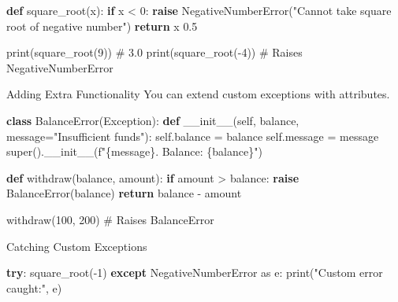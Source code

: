 \documentclass[
  letterpaper,
  DIV=11,
  numbers=noendperiod]{scrreprt}
\newenvironment{Shaded}{\begin{snugshade}}{\end{snugshade}}
\newcommand{\BuiltInTok}[1]{\textcolor[rgb]{0.00,0.23,0.31}{#1}}
\newcommand{\CommentTok}[1]{\textcolor[rgb]{0.37,0.37,0.37}{#1}}
\newcommand{\ControlFlowTok}[1]{\textcolor[rgb]{0.00,0.23,0.31}{\textbf{#1}}}
\newcommand{\DecValTok}[1]{\textcolor[rgb]{0.68,0.00,0.00}{#1}}
\newcommand{\FloatTok}[1]{\textcolor[rgb]{0.68,0.00,0.00}{#1}}
\newcommand{\FunctionTok}[1]{\textcolor[rgb]{0.28,0.35,0.67}{#1}}
\newcommand{\ImportTok}[1]{\textcolor[rgb]{0.00,0.46,0.62}{#1}}
\newcommand{\KeywordTok}[1]{\textcolor[rgb]{0.00,0.23,0.31}{\textbf{#1}}}
\newcommand{\NormalTok}[1]{\textcolor[rgb]{0.00,0.23,0.31}{#1}}
\newcommand{\OperatorTok}[1]{\textcolor[rgb]{0.37,0.37,0.37}{#1}}
\newcommand{\PreprocessorTok}[1]{\textcolor[rgb]{0.68,0.00,0.00}{#1}}
\newcommand{\SpecialCharTok}[1]{\textcolor[rgb]{0.37,0.37,0.37}{#1}}
\newcommand{\SpecialStringTok}[1]{\textcolor[rgb]{0.13,0.47,0.30}{#1}}
\newcommand{\StringTok}[1]{\textcolor[rgb]{0.13,0.47,0.30}{#1}}
\newcommand{\VariableTok}[1]{\textcolor[rgb]{0.07,0.07,0.07}{#1}}
\begin{document}
\begin{Shaded}
\begin{Highlighting}[]
\KeywordTok{def}\NormalTok{ square\_root(x):}
    \ControlFlowTok{if}\NormalTok{ x }\OperatorTok{\textless{}} \DecValTok{0}\NormalTok{:}
        \ControlFlowTok{raise}\NormalTok{ NegativeNumberError(}\StringTok{"Cannot take square root of negative number"}\NormalTok{)}
    \ControlFlowTok{return}\NormalTok{ x  }\FloatTok{0.5}

\BuiltInTok{print}\NormalTok{(square\_root(}\DecValTok{9}\NormalTok{))   }\CommentTok{\# 3.0}
\BuiltInTok{print}\NormalTok{(square\_root(}\OperatorTok{{-}}\DecValTok{4}\NormalTok{))  }\CommentTok{\# Raises NegativeNumberError}
\end{Highlighting}
\end{Shaded}

Adding Extra Functionality You can extend custom exceptions with
attributes.

\begin{Shaded}
\begin{Highlighting}[]
\KeywordTok{class}\NormalTok{ BalanceError(}\PreprocessorTok{Exception}\NormalTok{):}
    \KeywordTok{def} \FunctionTok{\_\_init\_\_}\NormalTok{(}\VariableTok{self}\NormalTok{, balance, message}\OperatorTok{=}\StringTok{"Insufficient funds"}\NormalTok{):}
        \VariableTok{self}\NormalTok{.balance }\OperatorTok{=}\NormalTok{ balance}
        \VariableTok{self}\NormalTok{.message }\OperatorTok{=}\NormalTok{ message}
        \BuiltInTok{super}\NormalTok{().}\FunctionTok{\_\_init\_\_}\NormalTok{(}\SpecialStringTok{f"}\SpecialCharTok{\{}\NormalTok{message}\SpecialCharTok{\}}\SpecialStringTok{. Balance: }\SpecialCharTok{\{}\NormalTok{balance}\SpecialCharTok{\}}\SpecialStringTok{"}\NormalTok{)}

\KeywordTok{def}\NormalTok{ withdraw(balance, amount):}
    \ControlFlowTok{if}\NormalTok{ amount }\OperatorTok{\textgreater{}}\NormalTok{ balance:}
        \ControlFlowTok{raise}\NormalTok{ BalanceError(balance)}
    \ControlFlowTok{return}\NormalTok{ balance }\OperatorTok{{-}}\NormalTok{ amount}

\NormalTok{withdraw(}\DecValTok{100}\NormalTok{, }\DecValTok{200}\NormalTok{)   }\CommentTok{\# Raises BalanceError}
\end{Highlighting}
\end{Shaded}

Catching Custom Exceptions

\begin{Shaded}
\begin{Highlighting}[]
\ControlFlowTok{try}\NormalTok{:}
\NormalTok{    square\_root(}\OperatorTok{{-}}\DecValTok{1}\NormalTok{)}
\ControlFlowTok{except}\NormalTok{ NegativeNumberError }\ImportTok{as}\NormalTok{ e:}
    \BuiltInTok{print}\NormalTok{(}\StringTok{"Custom error caught:"}\NormalTok{, e)}
\end{Highlighting}
\end{Shaded}
\end{document}
